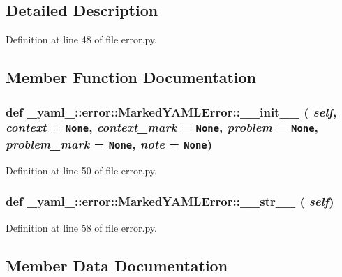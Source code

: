 \subsection{Detailed Description}


Definition at line 48 of file error.py.

\subsection{Member Function Documentation}
\subsubsection{\setlength{\rightskip}{0pt plus 5cm}def \_\-yaml\_\-::error::MarkedYAMLError::\_\-\_\-init\_\-\_\- ( {\em self},  {\em context} = {\tt None},  {\em context\_\-mark} = {\tt None},  {\em problem} = {\tt None},  {\em problem\_\-mark} = {\tt None},  {\em note} = {\tt None})}\label{class__yaml___1_1error_1_1MarkedYAMLError_fb5920ad2ab25b763f7ce60d99fcac32}




Definition at line 50 of file error.py.
\subsubsection{\setlength{\rightskip}{0pt plus 5cm}def \_\-yaml\_\-::error::MarkedYAMLError::\_\-\_\-str\_\-\_\- ( {\em self})}\label{class__yaml___1_1error_1_1MarkedYAMLError_d44446cb781b6e99ff0664bbc4383b31}




Definition at line 58 of file error.py.

\subsection{Member Data Documentation}
\subsubsection{}\label{class__yaml___1_1error_1_1MarkedYAMLError_2b2d407128d461fec171c2c866a9b50f}





